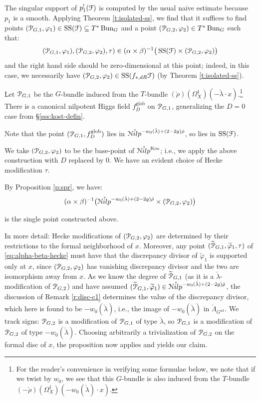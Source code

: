 \documentclass[reqno,11pt]{amsart}
\numberwithin{equation}{subsection}
\theoremstyle{remark}
\newcommand{\sF}{{\EuScript F}}
\newcommand{\sN}{{\EuScript N}}
\newcommand{\sP}{{\EuScript P}}
\newcommand{\on}{\operatorname}
\newcommand{\ol}[1]{\overline{#1}{}}
\newcommand{\ad}{\on{ad}}
\newcommand{\vph}{\varphi}
\newcommand{\Bun}{\on{Bun}}
\renewcommand{\o}[1]{\mathring{#1}}
\renewcommand{\subset}{\subseteq}
\newcommand{\Nilp}{\sN ilp}
\newcommand{\Kos}{\on{Kos}}
\renewcommand{\SS}{\on{SS}}
\begin{document}
The singular support of $p_1^!(\sF)$ is computed by the usual naive estimate because
$p_1$ is a smooth.
Applying Theorem \ref{t:isolated-ss}, we find that
it suffices to find points $(\sP_{G,1},\vph_1) \in \SS(\sF) \subset T^*\Bun_G$
and a point $(\sP_{G,2},\vph_2) \in T^*\Bun_G$ such that:
%
\[
(\sP_{G,1},\vph_1),(\sP_{G,2},\vph_2),\tau) \in 
(\alpha\times\beta)^{-1}\big(\SS(\sF) \times (\sP_{G,2},\vph_2)\big)
\]
and the right hand side should be zero-dimensional at this point; 
indeed, in this case, we necessarily 
have $(\sP_{G,2},\vph_2) \in \SS(f_{*,dR}\sF)$ (by Theorem \ref{t:isolated-ss}).

Let $\sP_{G,1}$ be the $G$-bundle induced from the $T$-bundle
$(\check{\rho})(\Omega_X^1)(-\check{\lambda}\cdot x)$.\footnote{For the reader's
convenience in verifying some formulae below, we note that if 
we twist by $w_0$, we see that
this $G$-bundle is also induced from the $T$-bundle 
$(-\check{\rho})(\Omega_X^1)(-w_0(\check{\lambda})\cdot x)$.} 
There is a canonical nilpotent Higgs field $f_D^{\on{glob}}$ on $\sP_{G,1}$, 
generalizing the $D = 0$ case from \S \ref{sss:kost-defin}.

Note that the point $(\sP_{G,1},f_D^{\on{glob}})$ lies in 
$\o{\Nilp}^{-w_0(\check{\lambda})+(2-2g)\check{\rho}}$, so 
lies in $\SS(\sF)$. 

We take $(\sP_{G,2},\vph_2)$ to be the base-point of $\o{\Nilp}^{\Kos}$;
i.e., we apply the above construction with $D$ replaced by $0$.
We have an evident choice of Hecke modification $\tau$.

By Proposition \ref{p:spr}, we have:
%
\begin{equation}\label{eq:alpha-beta-hecke}
(\alpha\times\beta)^{-1}\big(\o{\Nilp}^{-w_0(\check{\lambda})+(2-2g)\check{\rho}} 
\times (\sP_{G,2},\vph_2)\big)
\end{equation}

\noindent is the single point constructed above.

In more detail: Hecke modifications of $(\sP_{G,2},\vph_2)$ are
determined by their restrictions to the formal neighborhood of $x$.
Moreover, any point $(\widetilde{\sP}_{G,1},\widetilde{\vph}_1,\tau)$ 
of \eqref{eq:alpha-beta-hecke} must have that the discrepancy divisor
of $\widetilde{\vph}_1$ is supported only at $x$, since $(\sP_{G,2},\vph_2)$
has vanishing discrepancy divisor and the two are isomorphism away from
$x$. As we know the degree of $\widetilde{\sP}_{G,1}$ (as it is
a $\check{\lambda}$-modification of $\sP_{G,2}$) and have
assumed $(\widetilde{\sP}_{G,1},\widetilde{\vph}_1) \in 
\o{\Nilp}^{-w_0(\check{\lambda})+(2-2g)\check{\rho}}$, the
discussion of Remark \ref{r:disc-c1} determines the value
of the discrepancy divisor, which here is found to be
$\ol{-w_0(\check{\lambda})}$, i.e., the image of
$-w_0(\check{\lambda})$ in $\check{\Lambda}_{G^{\ad}}$. 
We track signs: $\sP_{G,2}$ is a
modification of $\sP_{G,1}$ of type $\check{\lambda}$,
so $\sP_{G,1}$ is a modification of $\sP_{G,2}$ of type $-w_0(\check{\lambda})$.
Choosing arbitrarily a trivialization of $\sP_{G,2}$ on the formal
disc of $x$, the proposition now applies and yields our claim.
\end{document}
